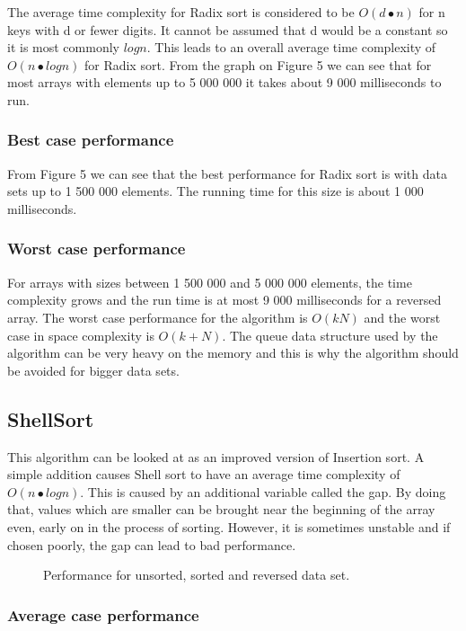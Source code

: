 \documentclass{acm_proc_article-sp}
\begin{document}
The average time complexity for Radix sort is considered to be $O(d•n)$ for n keys with d or fewer digits. It cannot be assumed that d would be a constant so it is most commonly $logn$. This leads to an overall average time complexity of $O(n•logn)$ for Radix sort. From the graph on Figure 5 we can see that for most arrays with elements up to 5 000 000 it takes about 9 000 milliseconds to run.

\subsubsection{Best case performance}

From Figure 5 we can see that the best performance for Radix sort is with data sets up to 1 500 000 elements. The running time for this size is about 1 000 milliseconds.

\subsubsection{Worst case performance}

For arrays with sizes between 1 500 000 and 5 000 000 elements, the time complexity grows and the run time is at most 9 000 milliseconds for a reversed array. The worst case performance for the algorithm is $O(kN)$ and the worst case in space complexity is $O(k+N)$. The queue data structure used by the algorithm can be very heavy on the memory and this is why the algorithm should be avoided for bigger data sets.

\subsection{ShellSort}

This algorithm can be looked at as an improved version of Insertion sort. A simple addition causes Shell sort to have an average time complexity of $O(n•logn)$. This is caused by an additional variable called the gap. By doing that, values which are smaller can be brought near the beginning of the array even, early on in the process of sorting. However, it is sometimes unstable and if chosen poorly, the gap can lead to bad performance.

\begin{figure}[!htb]
\caption{Performance for unsorted, sorted and reversed data set.}
\end{figure}

\subsubsection{Average case performance}
\end{document}
